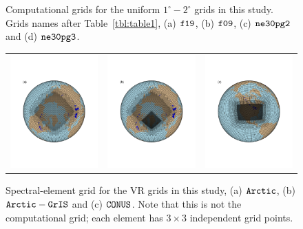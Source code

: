 \documentclass[draft]{agujournal2019}
\begin{document}
\begin{figure}[t]
\begin{center}
\begin{tabular}{cc}
\end{tabular}
\end{center}
\caption{Computational grids for the uniform $1^{\circ}-2^{\circ}$ grids in this study. Grids names after Table~\ref{tbl:table1}, (a) $\tt f19$, (b) $\tt f09$, (c) $\tt ne30pg2$ and (d) $\tt ne30pg3$.}
\label{fig:uni-grids}
\end{figure}

\begin{figure}[t]
\begin{center}
\begin{tabular}{ccc}
         \includegraphics[width=40mm]{figs/grid-ARCTIC.pdf}&
         \includegraphics[width=40mm]{figs/grid-ARCTICGRIS.pdf}&
         \includegraphics[width=40mm]{figs/grid-CONUS.pdf} \\
\end{tabular}
\end{center}
\caption{Spectral-element grid for the VR grids in this study, (a) $\tt Arctic$, (b) $\tt Arctic-GrIS$ and (c) $\tt CONUS$. Note that this is not the computational grid; each element has $3\times3$ independent grid points.}
\label{fig:vr-grids}
\end{figure}
\end{document}
